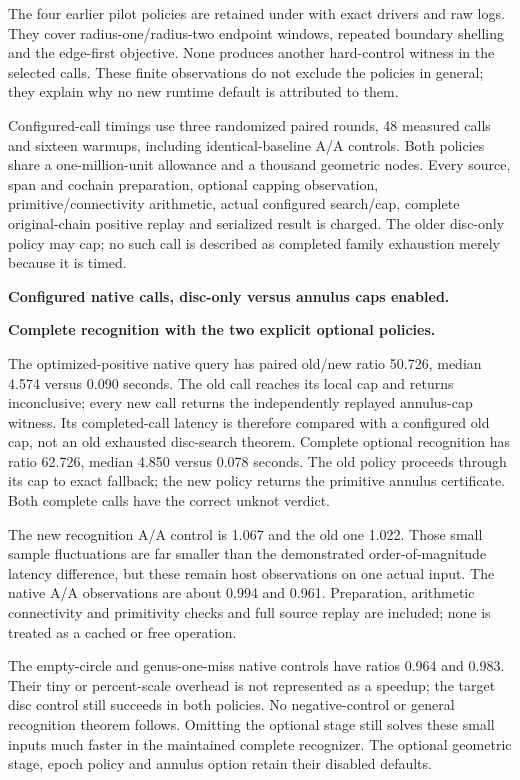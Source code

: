 The four earlier pilot policies are retained under
 with exact drivers and raw logs.
They cover radius-one/radius-two endpoint windows, repeated boundary shelling
and the edge-first objective. None produces another hard-control witness in
the selected calls. These finite observations do not exclude the policies
in general; they explain why no new runtime default is attributed to them.

Configured-call timings use three randomized paired rounds, 48 measured
calls and sixteen warmups, including identical-baseline A/A controls. Both
policies share a one-million-unit allowance and a thousand geometric nodes.
Every source, span and cochain preparation, optional capping observation,
primitive/connectivity arithmetic, actual configured search/cap, complete
original-chain positive replay and serialized result is charged. The older
disc-only policy may cap; no such call is described as completed family
exhaustion merely because it is timed.

\textbf{Configured native calls, disc-only versus annulus caps enabled.}

\textbf{Complete recognition with the two explicit optional policies.}


The optimized-positive native query has paired old/new ratio 50.726,
median 4.574 versus 0.090 seconds. The old call reaches its local cap and
returns inconclusive; every new call returns the independently replayed
annulus-cap witness. Its completed-call latency is therefore compared with
a configured old cap, not an old exhausted disc-search theorem.
Complete optional recognition has ratio 62.726, median 4.850 versus 0.078
seconds. The old policy proceeds through its cap to exact fallback; the
new policy returns the primitive annulus certificate. Both complete calls
have the correct unknot verdict.

The new recognition A/A control is 1.067 and the old one 1.022. Those small
sample fluctuations are far smaller than the demonstrated order-of-magnitude
latency difference, but these remain host observations on one actual input.
The native A/A observations are about 0.994 and 0.961. Preparation, arithmetic
connectivity and primitivity checks and full source replay are included;
none is treated as a cached or free operation.

The empty-circle and genus-one-miss native controls have ratios 0.964 and
0.983. Their tiny or percent-scale overhead is not represented as a speedup;
the target disc control still succeeds in both policies. No negative-control
or general recognition theorem follows. Omitting the optional stage still
solves these small inputs much faster in the maintained complete recognizer.
The optional geometric stage, epoch policy and annulus option retain their
disabled defaults.

